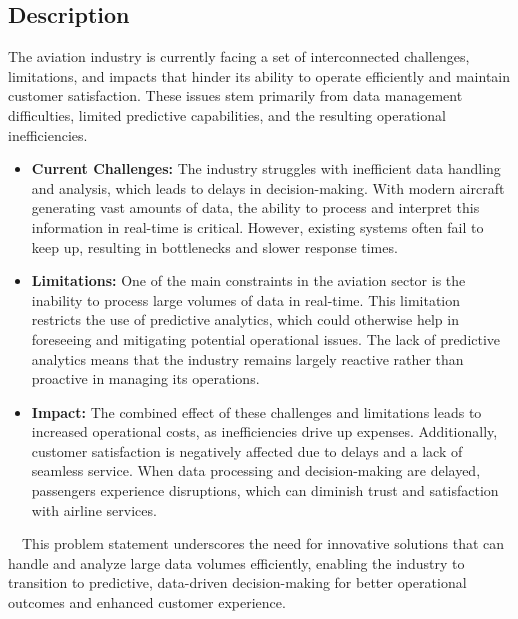 \documentclass[12pt,a4paper]{article}
\begin{document}
\subsection{Description}
The aviation industry is currently facing a set of interconnected challenges,
limitations, and impacts that hinder its ability to operate efficiently and
maintain customer satisfaction. These issues stem primarily from data management
difficulties, limited predictive capabilities, and the resulting operational
inefficiencies.
    \begin{itemize}
        \item \textbf{Current Challenges:} The industry struggles with
        inefficient data handling and analysis, which leads to delays in
        decision-making. With modern aircraft generating vast amounts of data,
        the ability to process and interpret this information in real-time is
        critical. However, existing systems often fail to keep up, resulting in
        bottlenecks and slower response times.
        \item \textbf{Limitations:} One of the main constraints in the aviation
        sector is the inability to process large volumes of data in real-time.
        This limitation restricts the use of predictive analytics, which could
        otherwise help in foreseeing and mitigating potential operational
        issues. The lack of predictive analytics means that the industry remains
        largely reactive rather than proactive in managing its operations.
        \item \textbf{Impact:} The combined effect of these challenges and
        limitations leads to increased operational costs, as inefficiencies
        drive up expenses. Additionally, customer satisfaction is negatively
        affected due to delays and a lack of seamless service. When data
        processing and decision-making are delayed, passengers experience
        disruptions, which can diminish trust and satisfaction with airline
        services.
    
    \end{itemize}
    $\quad$This problem statement underscores the need for innovative solutions
    that can handle and analyze large data volumes efficiently, enabling the
    industry to transition to predictive, data-driven decision-making for better
    operational outcomes and enhanced customer experience.
\end{document}
